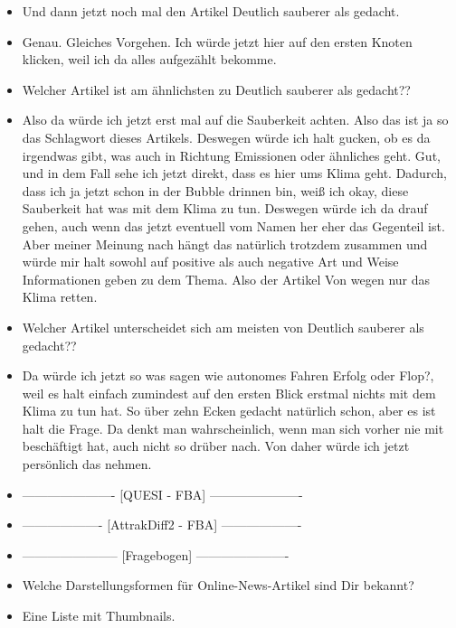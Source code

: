 {\begin{itemize}[]
    Ich war gerade am Überlegen, wie ich am besten alle aufgezählt bekomme, aber dann wahrscheinlich oben mit dem Knoten und dann sehe ich den hier direkt.
    \item {} Und dann jetzt noch mal den Artikel \flqq Deutlich sauberer als gedacht\frqq{}.
    \item {} Genau. Gleiches Vorgehen. Ich würde jetzt hier auf den ersten Knoten klicken, weil ich da alles aufgezählt bekomme.
    \item {} Welcher Artikel ist am ähnlichsten zu \flqq Deutlich sauberer als gedacht?\frqq{}?
    \item {} Also da würde ich jetzt erst mal auf die Sauberkeit achten.
    Also das ist ja so das Schlagwort dieses Artikels.
    Deswegen würde ich halt gucken, ob es da irgendwas gibt, was auch in Richtung Emissionen oder ähnliches geht.
    Gut, und in dem Fall sehe ich jetzt direkt, dass es hier ums Klima geht.
    Dadurch, dass ich ja jetzt schon in der Bubble drinnen bin, weiß ich okay, diese Sauberkeit hat was mit dem Klima zu tun.
    Deswegen würde ich da drauf gehen, auch wenn das jetzt eventuell vom Namen her eher das Gegenteil ist.
    Aber meiner Meinung nach hängt das natürlich trotzdem zusammen und würde mir halt sowohl auf positive als auch negative Art und Weise Informationen geben zu dem Thema. 
    Also der Artikel \flqq Von wegen nur das Klima retten\frqq{}.
    \item {} Welcher Artikel unterscheidet sich am meisten von \flqq Deutlich sauberer als gedacht?\frqq{}?
    \item {} Da würde ich jetzt so was sagen wie \flqq autonomes Fahren Erfolg oder Flop?\frqq{}, weil es halt einfach zumindest auf den ersten Blick erstmal nichts mit dem Klima zu tun hat.
    So über zehn Ecken gedacht natürlich schon, aber es ist halt die Frage.
    Da denkt man wahrscheinlich, wenn man sich vorher nie mit beschäftigt hat, auch nicht so drüber nach.
    Von daher würde ich jetzt persönlich das nehmen.
    \item {----------------------} [QUESI - FBA] {----------------------}
    \item {-------------------} [AttrakDiff2 - FBA] {-------------------}
    \item {-----------------------} [Fragebogen] {----------------------}
    \item {} Welche Darstellungsformen für Online-News-Artikel sind Dir bekannt?
    \item {} Eine Liste mit Thumbnails. 

\end{itemize}}
